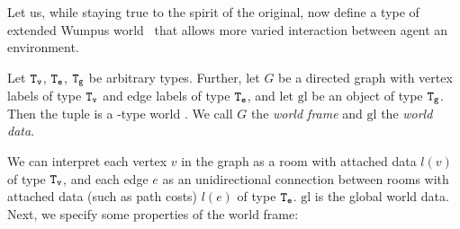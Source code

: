 Let us, while staying true to the spirit of the original, now define a type of extended Wumpus world \wext\ that allows more varied interaction between agent an environment.

\begin{definition}\label{def:wext}
	Let $\mathtt{T_v}$, $\mathtt{T_e}$, $\mathtt{T_g}$ be arbitrary types. Further, let $G$ be a directed graph with vertex labels of type $\mathtt{T_v}$ and edge labels of type $\mathtt{T_e}$, and let $\mathrm{gl}$ be an object of type $\mathtt{T_g}$. Then the tuple  is a \wext-type world . We call $G$ the {\em world frame} and $\mathrm{gl}$ the {\em world data}.
\end{definition}

We can interpret each vertex $v$ in the graph as a room with attached data $l(v)$ of type $\mathtt{T_v}$, and each edge $e$ as an unidirectional connection between rooms with attached data (such as path costs) $l(e)$ of type $\mathtt{T_e}$. $\mathrm{gl}$ is the global world data. Next, we specify some properties of the world frame:

